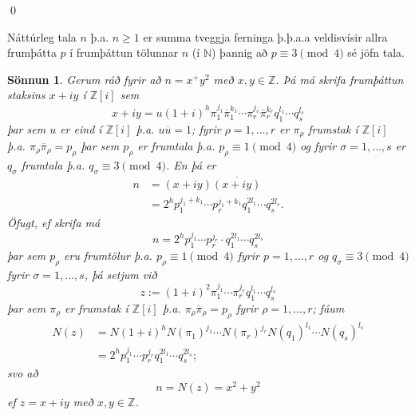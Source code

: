 \documentclass[a4paper,icelandic,11pt]{book}
\theoremstyle{plain}
\newtheorem*{sonnun}{Sönnun}
\newcommand{\N}{\mathbb{N}}
\newcommand{\Z}{\mathbb{Z}}
\begin{document}
\qed
\begin{setn}
  Náttúrleg tala $n$ þ.a. $n\geq 1$ er summa tveggja ferninga þ.þ.a.a
  veldisvísir allra frumþátta $p$ í frumþáttun tölunnar $n$ (í $\N$) þannig að
  $p\equiv 3\pmod 4$ sé jöfn tala.
\end{setn}
\begin{sonnun}
  Gerum ráð fyrir að $n=x^+y^2$ með $x,y\in\Z$. Þá má skrifa frumþáttun staksins
  $x+iy$ í $\Z[i]$ sem\[
  x+iy
  = u(1+i)^h
    \pi_1^{j_1} \overline\pi_1^{k_1}\cdots \pi_r^{j_r}\overline\pi_r^{k_r} 
    q_1^{l_1}\cdots q_s^{l_s}
  \]
  þar sem $u$ er eind í $\Z[i]$ þ.a. $u\overline u=1$; fyrir $\rho=1,\dots,r$ er
  $\pi_\rho$ frumstak í $\Z[i]$ þ.a. $\pi_\rho\overline\pi_\rho = p_\rho$ þar sem
  $p_\rho$ er frumtala þ.a. $p_\rho\equiv 1\pmod 4$ og fyrir $\sigma=1,\dots,s$
  er $q_\sigma$ frumtala þ.a. $q_\sigma \equiv 3\pmod 4$. En þá er 
  \begin{align*}
    n
    &= (x+iy)\overline{(x+iy)}
    \\
    &= 2^h p_1^{j_1+k_1}\cdots p_r^{j_1+k_1} q_1^{2l_1}\cdots q_s^{2l_s}.
  \end{align*}
  \emph{Öfugt,} ef skrifa má 
  \[
  n = 2^h p_1^{j_1} \cdots p_r^{j_r}\cdot q_1^{2l_1}\cdots q_s^{2l_s}
  \]
  þar sem $p_\rho$ eru frumtölur þ.a. $p_\rho \equiv 1\pmod 4$ fyrir
  $p=1,\dots,r$ og $q_\sigma \equiv 3\pmod 4$ fyrir $\sigma = 1,\dots,s$, þá
  setjum við 
  \[
  z := (1+i)^2 \pi_1^{j_1}\cdots\pi_r^{j_r} q_1^{l_1}\cdots q_s^{l_s}
  \]
  þar sem $\pi_\rho$ er frumstak í $\Z[i]$ þ.a. $\pi_\rho\overline\pi_\rho =
  p_\rho$ fyrir $\rho = 1,\dots,r$; fáum 
  \begin{align*}
    N(z) 
    &= N(1+i)^h 
       N(\pi_1)^{j_1} \cdots N(\pi_r)^{j_r}
       N(q_1)^{l_1}\cdots N(q_s)^{l_s}
    \\
    &= 2^h p_1^{j_1}\cdots p_r^{j_r}
       q_1^{2l_1}\cdots q_s^{2l_s};
  \end{align*}
  svo að 
  \[
  n = N(z) = x^2 + y^2
  \]
  ef $z = x+iy$ með $x,y\in\Z$.
\end{sonnun}

\printindex
\end{document}
